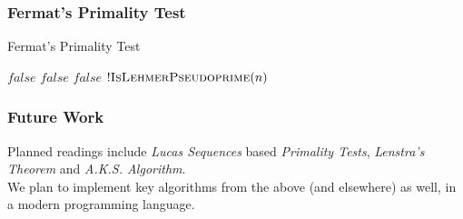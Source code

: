 \documentclass{beamer}
\begin{document}
\begin{frame}
\frametitle{Fermat's Primality Test}
\begin{algorithm}[H]
\caption{Fermat's Primality Test}
\label{alg:FermatPrimalityTest}
\begin{algorithmic}
	\State \Return $false$ 
\EndIf
{}
		\State \Return $false$ 
	\EndIf
\EndFor
{}
	\State \Return $false$ 
\EndIf
\State \Return $!\Call{IsLehmerPseudoprime}{n}$ 
\EndProcedure
\end{algorithmic}
\end{algorithm}

\end{frame}

\begin{frame}
\frametitle{Future Work}
Planned readings include \emph{Lucas Sequences} based \emph{Primality Tests}, \emph{Lenstra's Theorem} and \emph{A.K.S. Algorithm}.
\\[3mm]
We plan to implement key algorithms from the above (and elsewhere) as well, in a modern programming language.
\end{frame}
\end{document}
